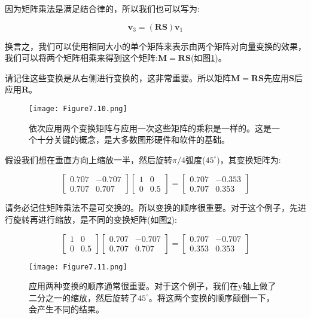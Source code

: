 因为矩阵乘法是满足结合律的，所以我们也可以写为:

\begin{equation}
	\mathbf{v}_3=(\mathbf{R S}) \mathbf{v}_1
	\nonumber
\end{equation}

换言之，我们可以使用相同大小的单个矩阵来表示由两个矩阵对向量变换的效果，我们可以将两个矩阵相乘来得到这个矩阵:$\mathbf{M}=\mathbf{R S}$(如图\ref{fig:7.10})。

请记住这些变换是从右侧进行变换的，这非常重要。所以矩阵$\mathbf{M}=\mathbf{R S}$先应用$\mathbf{S}$后应用$\mathbf{R}$。

\begin{figure}[htbp]
	\centering
	\texttt{[image: Figure7.10.png]}
	\caption{依次应用两个变换矩阵与应用一次这些矩阵的乘积是一样的。这是一个十分关键的概念，是大多数图形硬件和软件的基础。}
	\label{fig:7.10}
\end{figure}	

\begin{example}
	假设我们想在垂直方向上缩放一半，然后旋转$\pi/4$弧度($45^{\circ}$)，其变换矩阵为:
	
	\begin{equation}
		\left[\begin{array}{cr}
			0.707 & -0.707 \\
			0.707 & 0.707
		\end{array}\right]\left[\begin{array}{cc}
			1 & 0 \\
			0 & 0.5
		\end{array}\right]=\left[\begin{array}{cc}
			0.707 & -0.353 \\
			0.707 & 0.353
		\end{array}\right]
	\nonumber
	\end{equation}

请务必记住矩阵乘法不是可交换的。所以变换的顺序很重要。对于这个例子，先进行旋转再进行缩放，是不同的变换矩阵(如图\ref{fig:7.11}):

\begin{equation}
	\left[\begin{array}{cc}
		1 & 0 \\
		0 & 0.5
	\end{array}\right]\left[\begin{array}{cr}
		0.707 & -0.707 \\
		0.707 & 0.707
	\end{array}\right]=\left[\begin{array}{rr}
		0.707 & -0.707 \\
		0.353 & 0.353
	\end{array}\right]
\nonumber
\end{equation}

\begin{figure}[htbp]
	\centering
	\texttt{[image: Figure7.11.png]}
	\caption{应用两种变换的顺序通常很重要。对于这个例子，我们在y轴上做了二分之一的缩放，然后旋转了$45^{\circ}$。将这两个变换的顺序颠倒一下，会产生不同的结果。}
	\label{fig:7.11}
\end{figure}	

\end{example}

